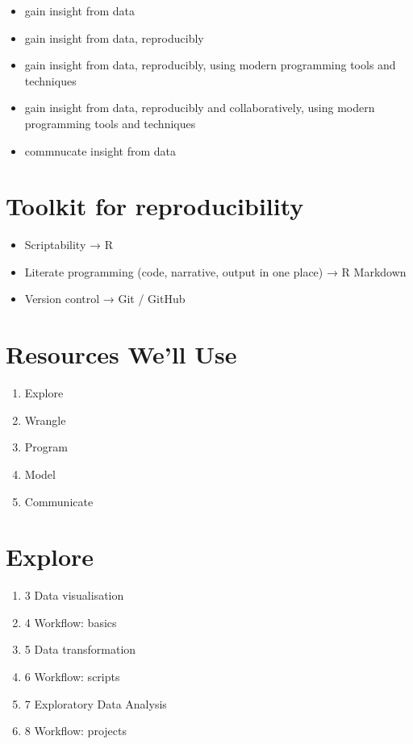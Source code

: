 \documentclass[
]{book}
\providecommand{\tightlist}{%
  \setlength{\itemsep}{0pt}\setlength{\parskip}{0pt}}
\theoremstyle{definition}
\theoremstyle{definition}
\theoremstyle{definition}
\theoremstyle{definition}
\theoremstyle{remark}
\begin{document}
\begin{itemize}
\tightlist
\item
  gain insight from data
\item
  gain insight from data, reproducibly
\item
  gain insight from data, reproducibly, using modern programming tools and techniques
\item
  gain insight from data, reproducibly and collaboratively, using modern programming tools and techniques
\item
  commnucate insight from data
\end{itemize}

\hypertarget{toolkit-for-reproducibility}{%
\section{Toolkit for reproducibility}\label{toolkit-for-reproducibility}}

\begin{itemize}
\tightlist
\item
  Scriptability → R
\item
  Literate programming (code, narrative, output in one place) → R Markdown
\item
  Version control → Git / GitHub
\end{itemize}

\hypertarget{resources-well-use}{%
\section{Resources We'll Use}\label{resources-well-use}}

\begin{enumerate}
\def\labelenumi{\arabic{enumi})}
\item
  Explore
\item
  Wrangle
\item
  Program
\item
  Model
\item
  Communicate
\end{enumerate}

\hypertarget{explore}{%
\section{Explore}\label{explore}}

\begin{enumerate}
\def\labelenumi{\alph{enumi})}
\setcounter{enumi}{1}
\tightlist
\item
  3 Data visualisation
\item
  4 Workflow: basics
\item
  5 Data transformation
\item
  6 Workflow: scripts
\item
  7 Exploratory Data Analysis
\item
  8 Workflow: projects
\end{enumerate}
\end{document}
